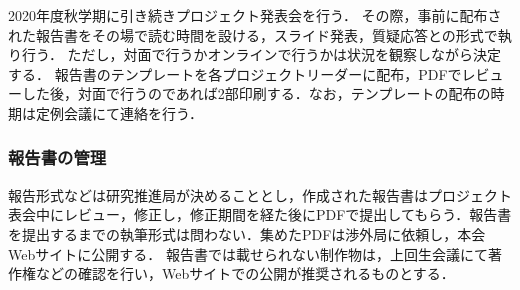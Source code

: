 2020年度秋学期に引き続きプロジェクト発表会を行う．
その際，事前に配布された報告書をその場で読む時間を設ける，スライド発表，質疑応答との形式で執り行う．
ただし，対面で行うかオンラインで行うかは状況を観察しながら決定する．
報告書のテンプレートを各プロジェクトリーダーに配布，PDFでレビューした後，対面で行うのであれば2部印刷する．なお，テンプレートの配布の時期は定例会議にて連絡を行う．


\subsubsection* {報告書の管理}

報告形式などは研究推進局が決めることとし，作成された報告書はプロジェクト表会中にレビュー，修正し，修正期間を経た後にPDFで提出してもらう．報告書を提出するまでの執筆形式は問わない．集めたPDFは渉外局に依頼し，本会Webサイトに公開する．
報告書では載せられない制作物は，上回生会議にて著作権などの確認を行い，Webサイトでの公開が推奨されるものとする．